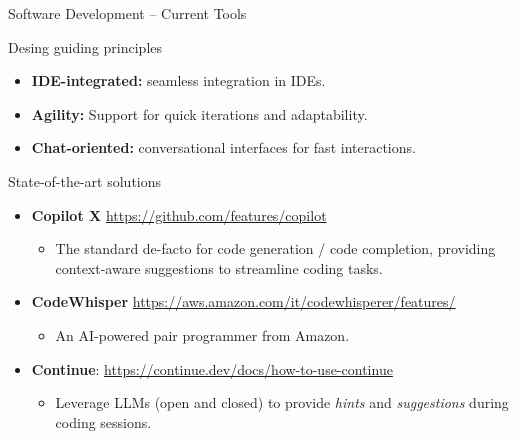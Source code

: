 \documentclass[presentation, 10pt]{beamer}\mode<presentation>{\usetheme{AMSBolognaFC}}
\begin{document}
\begin{frame}{Software Development -- Current Tools}
\begin{exampleblock}{Desing guiding principles}
	\begin{itemize}
		\item \textbf{IDE-integrated:} seamless integration in IDEs.
		\item \textbf{Agility:} Support for quick iterations and adaptability.
		\item \textbf{Chat-oriented:} conversational interfaces for fast interactions.
	\end{itemize}
\end{exampleblock}
\begin{exampleblock}{State-of-the-art solutions}
	\begin{itemize}
		\item \textbf{Copilot X} \url{https://github.com/features/copilot}
		\begin{itemize}
			\item The standard de-facto for code generation / code completion, providing context-aware suggestions to streamline coding tasks.
		\end{itemize}
		\item \textbf{CodeWhisper} \url{https://aws.amazon.com/it/codewhisperer/features/}
		\begin{itemize}
			\item An AI-powered pair programmer from Amazon.
		\end{itemize}
		\item \textbf{Continue}: \url{https://continue.dev/docs/how-to-use-continue}
		\begin{itemize}
			\item Leverage LLMs (open and closed) to provide \emph{hints} and \emph{suggestions} during coding sessions.
		\end{itemize}
	\end{itemize}
\end{exampleblock}
\end{frame}
\end{document}
